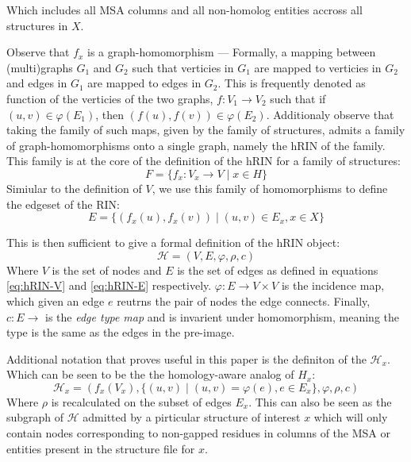 Which includes all MSA columns and all non-homolog entities accross all structures in $X$. 

Observe that $f_x$ is a graph-homomorphism --- Formally, a mapping between (multi)graphs $G_1$ and $G_2$ such that verticies in $G_1$ are mapped to verticies in $G_2$ and edges in $G_1$ are mapped to edges in $G_2$. This is frequently denoted as function of the verticies of the two graphs, $f: V_1 \to V_2$ such that if $(u,v) \in \varphi(E_1)$, then $(f(u), f(v)) \in \varphi(E_2)$. 
Additionaly observe that taking the family of such maps, given by the family of structures, admits a family of graph-homomorphisms onto a single graph, namely the hRIN of the family. This family is at the core of the definition of the hRIN for a family of structures: 
\begin{equation}
F = \{f_x: V_x \to V \mid x \in H\}
\end{equation}
Simiular to the definition of $V$, we use this family of homomorphisms to define the edgeset of the RIN:
\begin{equation}
E = \{(f_x(u), f_x(v)) \mid (u,v) \in E_x, x \in X\}
\label{eq:hRIN-E}
\end{equation}

This is then sufficient to give a formal definition of the hRIN object:
$$
\mathcal{H} =  (V, E, \varphi, \rho, c)
$$
Where $V$ is the set of nodes and $E$ is the set of edges as defined in equations \eqref{eq:hRIN-V} and \eqref{eq:hRIN-E} respectively. $\varphi: E \to V \times V$ is the incidence map, which given an edge $e$ reutrns the pair of nodes the edge connects. Finally, $c: E \to$ is the \emph{edge type map} and is invarient under homomorphism, meaning the type is the same as the edges in the pre-image.%

Additional notation that proves useful in this paper is the definiton of the $\mathcal{H}_x$. Which can be seen to be the the homology-aware analog of $H_x$: 
$$
\mathcal{H}_x = (f_x(V_x), \{(u,v) \mid (u,v) = \varphi(e), e \in E_x\}, \varphi, \rho, c)
$$
Where $\rho$ is recalculated on the subset of edges $E_x$. 
This can also be seen as the subgraph of $\mathcal{H}$ admitted by a pirticular structure of interest $x$ which will only contain nodes corresponding to non-gapped residues in columns of the MSA or entities present in the structure file for $x$.


